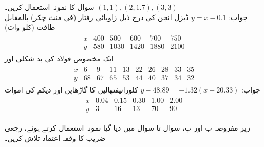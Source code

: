 \quad
سوال  کا نمونہ استعمال کریں۔
\quad
$(1,1),(2,1.7),(3,3)$\\
جواب:\quad
$y=x-0.1$
\quad
ڈیزل انجن کی درج ذیل زاویائی رفتار  (فی منٹ چکر) بالمقابل طاقت  (کلو واٹ)
\begin{align*}
\begin{array}{c|ccccc}
x&400&500&600&700&750\\
\hline
y&580&1030&1420&1880&2100
\end{array}
\end{align*}
\quad
ایک مخصوص فولاد کی بد شکلی  اور   
\begin{align*}
\begin{array}{c|ccccccccc}
x&6&9&11&13&22&26&28&33&35\\
\hline
y&68&67&65&53&44&40&37&34&32
\end{array}
\end{align*}
جواب:\quad
$y-48.89=-1.32(x-20.33)$
\quad
کلورانیفتھالین کا گاڑھاپن  اور دیکم کی اموات 
\begin{align*}
\begin{array}{c|ccccc}
x&0.04&0.15&0.30&1.00&2.00\\
\hline
y&3&16&13&70&90
\end{array}
\end{align*}

 زیر  مفروضہ ب اور پ، سوال  تا سوال  میں  دیا گیا نمونہ استعمال کرتے ہوئے، رجعی  ضریب   کا  وقفہ اعتماد تلاش کریں۔

